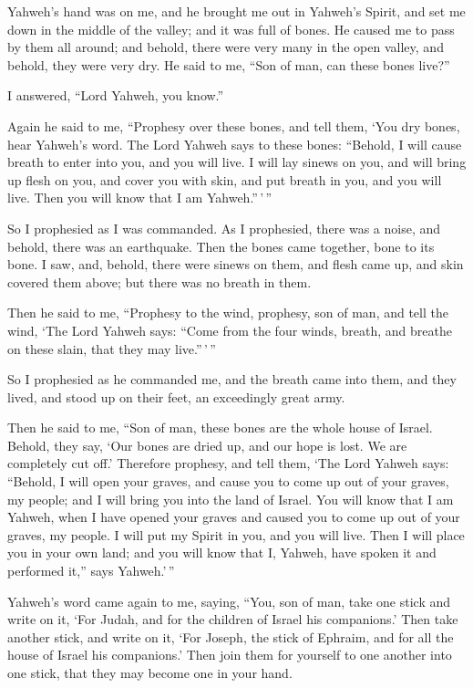  Yahweh's hand was on me, and he brought me out in
Yahweh's Spirit, and set me down in the middle of the valley; and it was
full of bones.  He caused me to pass by them all around;
and behold, there were very many in the open valley, and behold, they
were very dry.  He said to me, ``Son of man, can these
bones live?''

I answered, ``Lord Yahweh, you know.''

 Again he said to me, ``Prophesy over these bones, and
tell them, `You dry bones, hear Yahweh's word.  The Lord
Yahweh says to these bones: ``Behold, I will cause breath to enter into
you, and you will live.  I will lay sinews on you, and
will bring up flesh on you, and cover you with skin, and put breath in
you, and you will live. Then you will know that I am Yahweh.''\,'\,''

 So I prophesied as I was commanded. As I prophesied,
there was a noise, and behold, there was an earthquake. Then the bones
came together, bone to its bone.  I saw, and, behold,
there were sinews on them, and flesh came up, and skin covered them
above; but there was no breath in them.

 Then he said to me, ``Prophesy to the wind, prophesy, son
of man, and tell the wind, `The Lord Yahweh says: ``Come from the four
winds, breath, and breathe on these slain, that they may live.''\,'\,''

 So I prophesied as he commanded me, and the breath came
into them, and they lived, and stood up on their feet, an exceedingly
great army.

 Then he said to me, ``Son of man, these bones are the
whole house of Israel. Behold, they say, `Our bones are dried up, and
our hope is lost. We are completely cut off.'  Therefore
prophesy, and tell them, `The Lord Yahweh says: ``Behold, I will open
your graves, and cause you to come up out of your graves, my people; and
I will bring you into the land of Israel.  You will know
that I am Yahweh, when I have opened your graves and caused you to come
up out of your graves, my people.  I will put my Spirit
in you, and you will live. Then I will place you in your own land; and
you will know that I, Yahweh, have spoken it and performed it,'' says
Yahweh.'\,''

 Yahweh's word came again to me, saying, 
``You, son of man, take one stick and write on it, `For Judah, and for
the children of Israel his companions.' Then take another stick, and
write on it, `For Joseph, the stick of Ephraim, and for all the house of
Israel his companions.'  Then join them for yourself to
one another into one stick, that they may become one in your hand.

